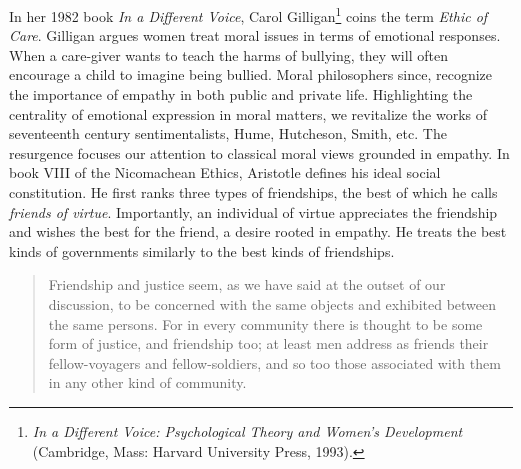 \documentclass[phdthesis,12pt,final,a4paper]{wuthesis}
\theoremstyle{definition}
\theoremstyle{definition}
\theoremstyle{definition}
\theoremstyle{definition}
\theoremstyle{remark}
\begin{document}
In her 1982 book \emph{In a Different Voice}, Carol Gilligan\footnote{\emph{In a Different Voice: Psychological Theory and Women's Development} (Cambridge, Mass: Harvard University Press, 1993).} coins the term \emph{Ethic of Care}. Gilligan argues women treat moral issues in terms of emotional responses. When a care-giver wants to teach the harms of bullying, they will often encourage a child to imagine being bullied. Moral philosophers since, recognize the importance of empathy in both public and private life. Highlighting the centrality of emotional expression in moral matters, we revitalize the works of seventeenth century sentimentalists, Hume, Hutcheson, Smith, etc. The resurgence focuses our attention to classical moral views grounded in empathy. In book VIII of the Nicomachean Ethics, Aristotle defines his ideal social constitution. He first ranks three types of friendships, the best of which he calls \emph{friends of virtue}. Importantly, an individual of virtue appreciates the friendship and wishes the best for the friend, a desire rooted in empathy. He treats the best kinds of governments similarly to the best kinds of friendships.

\begin{quote}
Friendship and justice seem, as we have said at the outset of our discussion, to be concerned with the same objects and exhibited between the same persons. For in every community there is thought to be some form of justice, and friendship too; at least men address as friends their fellow-voyagers and fellow-soldiers, and so too those associated with them in any other kind of community.
\end{quote}
\end{document}
